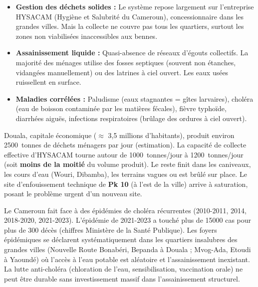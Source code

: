 \documentclass[11pt]{article}
\begin{document}
\begin{itemize}
    \item \textbf{Gestion des déchets solides :} Le système repose largement sur l'entreprise HYSACAM (Hygiène et Salubrité du Cameroun), concessionnaire dans les grandes villes. Mais la collecte ne couvre pas tous les quartiers, surtout les zones non viabilisées inaccessibles aux bennes.
    \item \textbf{Assainissement liquide :} Quasi-absence de réseaux d'égouts collectifs. La majorité des ménages utilise des fosses septiques (souvent non étanches, vidangées manuellement) ou des latrines à ciel ouvert. Les eaux usées ruissellent en surface.
    \item \textbf{Maladies corrélées :} Paludisme (eaux stagnantes = gîtes larvaires), choléra (eau de boisson contaminée par les matières fécales), fièvre typhoïde, diarrhées aiguës, infections respiratoires (brûlage des ordures à ciel ouvert).
\end{itemize}

\begin{exemplebox}
Douala, capitale économique ($\approx$ 3,5 millions d'habitants), produit environ \SI{2500}{tonnes} de déchets ménagers par jour (estimation). La capacité de collecte effective d'HYSACAM tourne autour de \SI{1000}{tonnes/jour} à \SI{1200}{tonnes/jour} (soit \textbf{moins de la moitié} du volume produit). Le reste finit dans les caniveaux, les cours d'eau (Wouri, Dibamba), les terrains vagues ou est brûlé sur place. Le site d'enfouissement technique de \textbf{Pk 10} (à l'est de la ville) arrive à saturation, posant le problème urgent d'un nouveau site.
\end{exemplebox}

\begin{savaistu}
Le Cameroun fait face à des épidémies de choléra récurrentes (2010-2011, 2014, 2018-2020, 2021-2023). L'épidémie de 2021-2023 a touché plus de \num{15000} cas pour plus de \num{300} décès (chiffres Ministère de la Santé Publique). Les foyers épidémiques se déclarent systématiquement dans les quartiers insalubres des grandes villes (Nouvelle Route Bonabéri, Bepanda à Douala ; Mvog-Ada, Etoudi à Yaoundé) où l'accès à l'eau potable est aléatoire et l'assainissement inexistant. La lutte anti-choléra (chloration de l'eau, sensibilisation, vaccination orale) ne peut être durable sans investissement massif dans l'assainissement structurel.
\end{savaistu}
\end{document}
